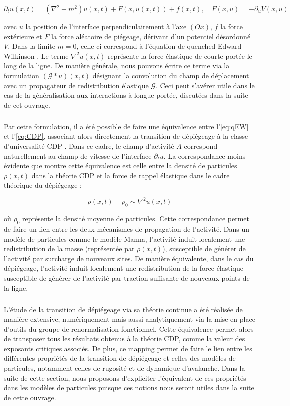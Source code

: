 \begin{equation}
	\partial_t u (x,t) = (\nabla^2 - m^2)u(x,t) + F(x, u(x,t)) + f(x,t), \quad F(x,u) = - \partial_u V(x,u)
	\label{eq:qEW}
\end{equation}

\noindent avec $u$ la position de l'interface perpendiculairement à l'axe $(Ox)$, $f$ la force extérieure et $F$ la force aléatoire de piégeage, dérivant d'un potentiel désordonné $V$. Dans la limite $m=0$, celle-ci correspond à l'équation de quenched-Edward-Wilkinson \cite{nattermann_dynamics_1992}. Le terme $\nabla^2 u (x,t)$ représente la force élastique de courte portée le long de la ligne. De manière générale, nous pouvons écrire ce terme via la formulation $(\mathcal{G}\ast u) (x,t)$ désignant la convolution du champ de déplacement avec un propagateur de redistribution élastique $\mathcal{G}$. Ceci peut s'avérer utile dans le cas de la généralisation aux interactions à longue portée, discutées dans la suite de cet ouvrage.

\subparagraph{}Par cette formulation, il a été possible de faire une équivalence entre l'\autoref{eq:qEW} et l'\autoref{eq:CDP}, associant alors directement la transition de dépiégeage à la classe d'universalité CDP \cite{le_doussal_exact_2015, wiese_hyperuniformity_2024}. Dans ce cadre, le champ d'activité $A$ correspond naturellement au champ de vitesse de l'interface $\partial_t u$. La correspondance moins évidente que montre cette équivalence est celle entre la densité de particules $\rho(x,t)$ dans la théorie CDP et la force de rappel élastique dans le cadre théorique du dépiégeage :

\begin{equation}
	\rho(x,t) - \rho_0 \sim \nabla^2 u (x,t)
	\label{eq:equivCDPdépiégeage}
\end{equation}

\noindent où $\rho_0$ représente la densité moyenne de particules. Cette correspondance permet de faire un lien entre les deux mécanismes de propagation de l'activité. Dans un modèle de particules comme le modèle Manna, l'activité induit localement une redistribution de la masse (représentée par $\rho(x,t)$), susceptible de générer de l'activité par surcharge de nouveaux sites. De manière équivalente, dans le cas du dépiégeage, l'activité induit localement une redistribution de la force élastique susceptible de générer de l'activité par traction suffisante de nouveaux points de la ligne.

\subparagraph{}L'étude de la transition de dépiégeage via sa théorie continue a été réalisée de manière extensive, numériquement mais aussi analytiquement via la mise en place d'outils du groupe de renormalisation fonctionnel. Cette équivalence permet alors de transposer tous les résultats obtenus à la théorie CDP, comme la valeur des exposants critiques associés. De plus, ce mapping permet de faire le lien entre les différentes propriétés de la transition de dépiégeage et celles des modèles de particules, notamment celles de rugosité et de dynamique d'avalanche. Dans la suite de cette section, nous proposons d'expliciter l'équivalent de ces propriétés dans les modèles de particules puisque ces notions nous seront utiles dans la suite de cette ouvrage.

